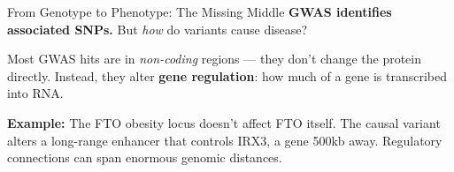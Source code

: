 \documentclass[aspectratio=169,10pt]{beamer}
\begin{document}
\begin{frame}{From Genotype to Phenotype: The Missing Middle}
\textbf{GWAS identifies associated SNPs.} But \emph{how} do variants cause disease?

\vspace{0.3em}
\begin{center}
\end{center}

\vspace{0.3em}
Most GWAS hits are in \emph{non-coding} regions --- they don't change the protein directly. Instead, they alter \textbf{gene regulation}: how much of a gene is transcribed into RNA.

\vspace{0.2em}
{\small \textbf{Example:} The FTO obesity locus doesn't affect FTO itself. The causal variant alters a long-range enhancer that controls IRX3, a gene 500kb away. Regulatory connections can span enormous genomic distances.}
\end{frame}
\end{document}
